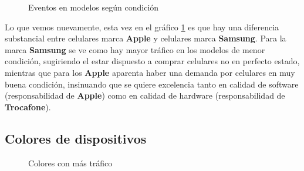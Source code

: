 \documentclass[a4paper]{article}
\begin{document}
\begin{figure}[!h]
	\caption{Eventos en modelos según condición}
	\label{fig:prominentescondicion}
\end{figure}

Lo que vemos nuevamente, esta vez en el gráfico \ref{fig:prominentescondicion} es que hay una diferencia substancial entre celulares marca \textbf{Apple} y celulares marca \textbf{Samsung}. Para la marca \textbf{Samsung} se ve como hay mayor tráfico en los modelos de menor condición, sugiriendo el estar dispuesto a comprar celulares no en perfecto estado, mientras que para los \textbf{Apple} aparenta haber una demanda por celulares en muy buena condición, insinuando que se quiere excelencia tanto en calidad de software (responsabilidad de \textbf{Apple}) como en calidad de hardware (responsabilidad de \textbf{Trocafone}).

\subsection{Colores de dispositivos}

\begin{figure}[!h]
	\caption{Colores con más tráfico}
	\label{fig:colores}
\end{figure}
\end{document}
